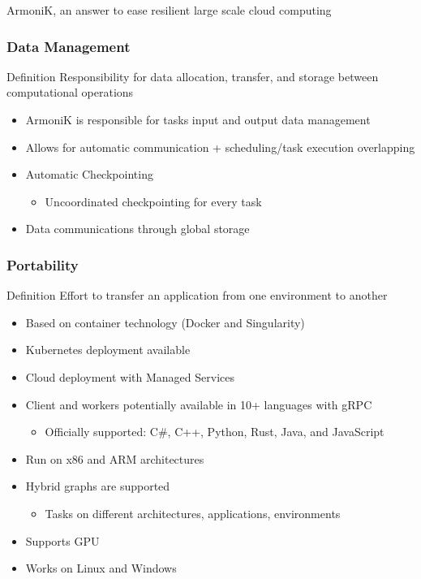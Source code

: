 \documentclass[10pt,aspectratio=1609]{beamer}
\begin{document}
\begin{section}{ArmoniK, an answer to ease resilient large scale cloud computing}
  \begin{frame}
    \frametitle{Data Management}
    \begin{block}{Definition}
      Responsibility for data allocation, transfer, and storage between computational operations
    \end{block}
    \begin{itemize}
      \item ArmoniK is responsible for tasks input and output data management
      \item Allows for automatic communication + scheduling/task execution overlapping
      \item Automatic Checkpointing
      \begin{itemize}
        \item Uncoordinated checkpointing for every task
      \end{itemize}
      \item Data communications through global storage
    \end{itemize}
  \end{frame}

  \begin{frame}
    \frametitle{Portability}
    \begin{block}{Definition}
      Effort to transfer an application from one environment to another
    \end{block}
    \begin{itemize}
      \item Based on container technology (Docker and Singularity)
      \item Kubernetes deployment available
      \item Cloud deployment with Managed Services
      \item Client and workers potentially available in 10+ languages with gRPC
      \begin{itemize}
        \item Officially supported: C\#, C++, Python, Rust, Java, and JavaScript
      \end{itemize}
      \item Run on x86 and ARM architectures
      \item Hybrid graphs are supported
      \begin{itemize}
        \item Tasks on different architectures, applications, environments
      \end{itemize}
      \item Supports GPU
      \item Works on Linux and Windows
    \end{itemize}
  \end{frame}


\end{section}
\end{document}
